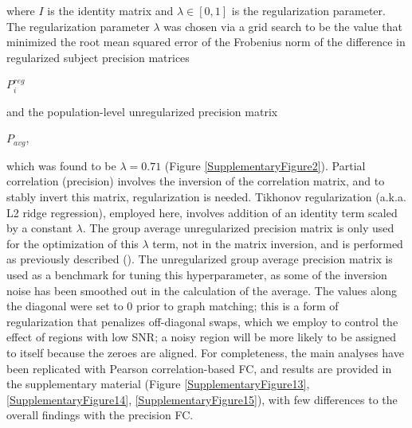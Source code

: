 \documentclass[phd,tocprelim]{cornell}
\begin{document}
    where $I$ is the identity matrix and $\lambda \in [0,1]$ is the regularization parameter. The regularization parameter $\lambda$ was chosen via a grid search to be the value that minimized the root mean squared error of the Frobenius norm of the difference in regularized subject precision matrices \begin{Large}$P_i^{reg}$\end{Large} and the population-level unregularized precision matrix \begin{Large}$P_{avg}$,\end{Large} which was found to be $\lambda = 0.71$ (Figure \ref{SupplementaryFigure2}). Partial correlation (precision) involves the inversion of the correlation matrix, and to stably invert this matrix, regularization is needed. Tikhonov regularization (a.k.a. L2 ridge regression), employed here, involves addition of an identity term scaled by a constant $\lambda$. The group average unregularized precision matrix is only used for the optimization of this $\lambda$ term, not in the matrix inversion, and is performed as previously described (\cite{Liegeois2020-ua, Golub1999-ou}). The unregularized group average precision matrix is used as a benchmark for tuning this hyperparameter, as some of the inversion noise has been smoothed out in the calculation of the average. The values along the diagonal were set to 0 prior to graph matching; this is a form of regularization that penalizes off-diagonal swaps, which we employ to control the effect of regions with low SNR; a noisy region will be more likely to be assigned to itself because the zeroes are aligned. For completeness, the main analyses have been replicated with Pearson correlation-based FC, and results are provided in the supplementary material (Figure \ref{SupplementaryFigure13}, \ref{SupplementaryFigure14}, \ref{SupplementaryFigure15}), with few differences to the overall findings with the precision FC.
    
\end{document}
